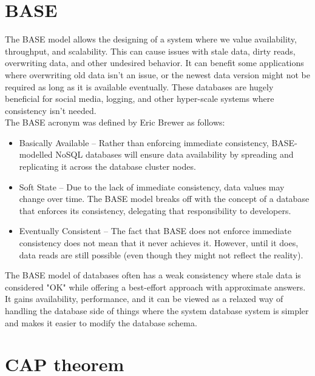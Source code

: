 \documentclass[a4paper,10pt,titlepage]{report}
\begin{document}
    \section{BASE}
    The BASE model allows the designing of a system where we value availability, throughput, and scalability. This can cause issues with stale data, dirty reads, overwriting data, and other undesired behavior. It can benefit some applications where overwriting old data isn't an issue, or the newest data version might not be required as long as it is available eventually. These databases are hugely beneficial for social media, logging, and other hyper-scale systems where consistency isn't needed.\\
    \vspace{5mm}
    The BASE acronym was defined by Eric Brewer\cite{brewer2000towards} as follows:

    \begin{itemize}
        \item Basically Available – Rather than enforcing immediate consistency, BASE-modelled NoSQL databases will ensure data availability by spreading and replicating it across the database cluster nodes.
        \item Soft State – Due to the lack of immediate consistency, data values may change over time. The BASE model breaks off with the concept of a database that enforces its consistency, delegating that responsibility to developers.
        \item Eventually Consistent – The fact that BASE does not enforce immediate consistency does not mean that it never achieves it. However, until it does, data reads are still possible (even though they might not reflect the reality).
    \end{itemize}

    The BASE model of databases often has a weak consistency where stale data is considered "OK" while offering a best-effort approach with approximate answers. It gains availability, performance, and it can be viewed as a relaxed way of handling the database side of things where the system database system is simpler and makes it easier to modify the database schema.


    \section{CAP theorem}
\end{document}

